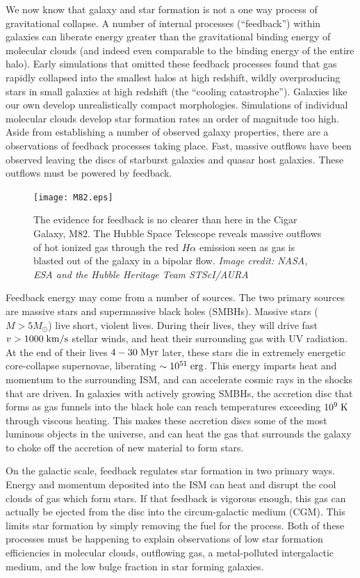 We now know that galaxy and star formation is not a one
way process of gravitational collapse.  A number of internal processes
(``feedback'') within galaxies can liberate energy greater than the
gravitational binding energy of molecular clouds (and indeed even comparable to
the binding energy of the entire halo).  Early simulations that omitted
these feedback processes found that gas rapidly collapsed into the smallest
halos at high redshift, wildly overproducing stars in small galaxies at
high redshift (the ``cooling catastrophe'').  Galaxies like our own develop
unrealistically compact morphologies.  Simulations of individual molecular
clouds develop star formation rates an order of magnitude too high.  Aside from
establishing a number of observed galaxy properties, there are a observations of
feedback processes taking place.  Fast, massive outflows have been observed
leaving the discs of starburst galaxies and quasar host galaxies.  These
outflows must be powered by feedback.

\begin{figure}
    \texttt{[image: M82.eps]}
    \caption[Massive outflows in M82]{The evidence for feedback is no clearer
    than here in the Cigar Galaxy, M82.  The Hubble Space Telescope reveals
    massive outflows of hot ionized gas through the red $H\alpha$ emission seen
    as gas is blasted out of the galaxy in a bipolar flow. \textit{Image credit:
    NASA, ESA and the Hubble Heritage Team STScI/AURA}}
\end{figure}

Feedback energy may come from a number of sources.  The two primary sources are
massive stars and supermassive black holes (SMBHs).  Massive stars ($M>5M_\odot$)
live short, violent lives.  During their lives, they will drive fast
$v>1000\;\rm{km/s}$ stellar winds, and heat their surrounding gas with UV
radiation.  At the end of their lives $4-30\;\rm{Myr}$ later, these stars die in
extremely energetic core-collapse supernovae, liberating $\sim10^{51}\;\rm{erg}$.
This energy imparts heat and momentum to the surrounding ISM, and can accelerate
cosmic rays in the shocks that are driven.  In galaxies with actively growing
SMBHs, the accretion disc that forms as gas funnels into the black hole can
reach temperatures exceeding $10^9\;\rm{K}$ through viscous heating.  This
makes these accretion discs some of the most luminous objects in the universe,
and can heat the gas that surrounds the galaxy to choke off the accretion of new
material to form stars.

On the galactic scale, feedback regulates star formation in two primary ways.
Energy and momentum deposited into the ISM can heat and disrupt the cool clouds
of gas which form stars.  If that feedback is vigorous enough, this gas can
actually be ejected from the disc into the circum-galactic medium (CGM).  This
limits star formation by simply removing the fuel for the process.  Both of
these processes must be happening to explain observations of low star
formation efficiencies in molecular clouds, outflowing gas, a metal-polluted
intergalactic medium, and the low bulge fraction in star forming galaxies.

